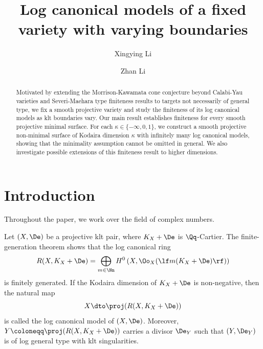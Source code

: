 \documentclass[12pt]{amsart}
\begin{document}
\title[Log canonical models of a fixed variety with varying boundaries]{Log canonical models of a fixed variety with varying boundaries}

\date{}


\begin{abstract}
Motivated by extending the Morrison-Kawamata cone conjecture beyond Calabi-Yau varieties and Severi-Maehara type finiteness results to targets not necessarily of general type, we fix a smooth projective variety and study the finiteness of its log canonical models as klt boundaries vary. Our main result establishes finiteness for every smooth projective minimal surface. For each $\kappa\in\{-\infty,0,1\}$, we construct a smooth projective non-minimal surface of Kodaira dimension $\kappa$ with infinitely many log canonical models, showing that the minimality assumption cannot be omitted in general. We also investigate possible extensions of this finiteness result to higher dimensions.
\end{abstract}




\author{Xingying Li}
\address[Xingying Li]{Department of Artificial Intelligence, Westlake University, Hangzhou 310030, China}

\author{Zhan Li}
\address[Zhan Li]{Department of Mathematics, Southern University of Science and Technology, Shenzhen 518055, China}

\maketitle

\setcounter{tocdepth}{2}
\tableofcontents

\section{Introduction}\label{sec:introduction}

Throughout the paper, we work over the field of complex numbers.

Let $(X, \De)$ be a projective klt pair, where $K_X + \De$ is $\Qq$-Cartier. The finite-generation theorem
\cite[Corollary~1.1.2]{BCHM10} shows that the log canonical ring
\[
R(X, K_X + \De) = \bigoplus_{m\in \Nn} H^0\left(X, \Oo_X(\lf m(K_X+\De)\rf)\right)
\]
is finitely generated. If the Kodaira dimension of $K_X+\De$ is non-negative, then the natural map 
\[
X \dto \proj (R(X, K_X+\De))
\] is called the log canonical model of $(X, \De)$. Moreover, $Y \coloneqq \proj (R(X, K_X+\De))$ carries a divisor $\De_Y$ such that $(Y, \De_Y)$ is of log general type with klt singularities. 
\end{document}
